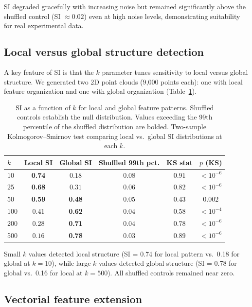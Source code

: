 \documentclass[11pt]{article}
\begin{document}
SI degraded gracefully with increasing noise but remained significantly above the shuffled control (SI $\approx 0.02$) even at high noise levels, demonstrating suitability for real experimental data.

\subsection{Local versus global structure detection}

A key feature of SI is that the $k$ parameter tunes sensitivity to local versus global structure. We generated two 2D point clouds (9{,}000 points each): one with local feature organization and one with global organization (Table~\ref{tab:local_global}).

\begin{table}[H]
\centering
\caption{SI as a function of $k$ for local and global feature patterns. Shuffled controls establish the null distribution. Values exceeding the 99th percentile of the shuffled distribution are bolded. Two-sample Kolmogorov--Smirnov test comparing local vs.\ global SI distributions at each $k$.}
\label{tab:local_global}
\begin{tabular}{lccccc}
\toprule
\textbf{$k$} & \textbf{Local SI} & \textbf{Global SI} & \textbf{Shuffled 99th pct.} & \textbf{KS stat} & \textbf{$p$ (KS)} \\
\midrule
10 & \textbf{0.74} & $0.18$ & $0.08$ & $0.91$ & $< 10^{-6}$ \\
25 & \textbf{0.68} & $0.31$ & $0.06$ & $0.82$ & $< 10^{-6}$ \\
50 & \textbf{0.59} & \textbf{0.48} & $0.05$ & $0.43$ & $0.002$ \\
100 & $0.41$ & \textbf{0.62} & $0.04$ & $0.58$ & $< 10^{-4}$ \\
200 & $0.28$ & \textbf{0.71} & $0.04$ & $0.78$ & $< 10^{-6}$ \\
500 & $0.16$ & \textbf{0.78} & $0.03$ & $0.89$ & $< 10^{-6}$ \\
\bottomrule
\end{tabular}
\end{table}

Small $k$ values detected local structure (SI = 0.74 for local pattern vs.\ 0.18 for global at $k = 10$), while large $k$ values detected global structure (SI = 0.78 for global vs.\ 0.16 for local at $k = 500$). All shuffled controls remained near zero.

\subsection{Vectorial feature extension}
\end{document}
